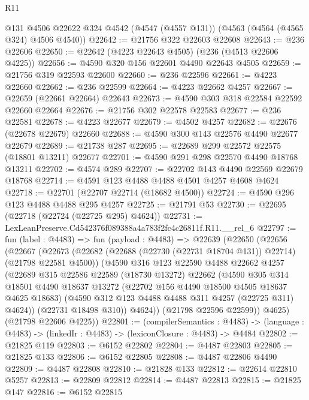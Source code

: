 \begin{lexlean}{R11}
\begin{coremodule}
    @131
    @4506
    @22622
    @324
    @4542
    (@4547 (@4557 @131))
    (@4563 (@4564 (@4565 @324) @4506 @4540))
@22642 := @21756 @322 @22603 @22608
@22643 := @236 @22606
@22650 := @22642 (@4223 @22643 @4505) (@236 (@4513 @22606 @4225))
@22656 := @4590 @320 @156 @22601 @4490 @22643 @4505
@22659 := @21756 @319 @22593 @22600
@22660 := @236 @22596
@22661 := @4223 @22660
@22662 := @236 @22599
@22664 := @4223 @22662 @4257
@22667 := @22659 (@22661 @22664) @22643
@22673 := @4590 @303 @318 @22584 @22592 @22660 @22664
@22676 := @21756 @302 @22578 @22583
@22677 := @236 @22581
@22678 := @4223 @22677
@22679 := @4502 @4257
@22682 := @22676 (@22678 @22679) @22660
@22688 := @4590 @300 @143 @22576 @4490 @22677 @22679
@22689 := @21738 @287
@22695 := @22689 @299 @22572 @22575 (@18801 @13211) @22677
@22701 := @4590 @291 @298 @22570 @4490 @18768 @13211
@22702 := @4574 @289
@22707 := @22702 @143 @4490 @22569 @22679 @18768
@22714 := @4591 @123 @4488 @4488 @4501 @4257 @4608 @4624
@22718 := @22701 (@22707 @22714 (@18682 @4500))
@22724 := @4590 @296 @123 @4488 @4488 @295 @4257
@22725 := @21791 @53
@22730 := @22695 (@22718 (@22724 (@22725 @295) @4624))
@22731 := LexLeanPreserve.Cd542376f089388a4a783f2fc4c26811f.R11.__rel_6
@22797 := fun (label : @4483) =>
  fun (payload : @4483) =>
  @22639
    (@22650
      (@22656
        (@22667
          (@22673
            (@22682 (@22688 (@22730 (@22731 @18704 @131)) @22714) (@21798 @22581 @4500))
            (@4590
              @316
              @123
              @22590
              @4488
              @22662
              @4257
              (@22689
                @315
                @22586
                @22589
                (@18730 @13272)
                @22662
                (@4590
                  @305
                  @314
                  @18501
                  @4490
                  @18637
                  @13272
                  (@22702 @156 @4490 @18500 @4505 @18637 @4625 @18683)
                  (@4590 @312 @123 @4488 @4488 @311 @4257 (@22725 @311) @4624))
                (@22731 @18498 @310))
              @4624))
          (@21798 @22596 @22599))
        @4625)
      (@21798 @22606 @4225))
@22801 := (compilerSemantics : @4483) ->
  (language : @4483) -> (linkedIr : @4483) -> (lexiconClosure : @4483) -> @4484
@22802 := @21825 @119
@22803 := @6152 @22802
@22804 := @4487 @22803
@22805 := @21825 @133
@22806 := @6152 @22805
@22808 := @4487 @22806 @4490
@22809 := @4487 @22808
@22810 := @21828 @133
@22812 := @22614 @22810 @5257
@22813 := @22809 @22812
@22814 := @4487 @22813
@22815 := @21825 @147
@22816 := @6152 @22815

\end{coremodule}
\end{lexlean}
